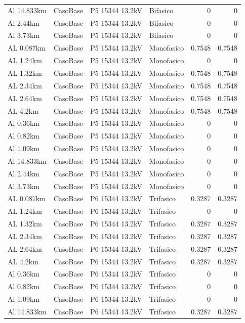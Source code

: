\documentclass[11pt,a4paper]{article}
\begin{document}
\begin{longtable}{llllrr}
Al 14.833km & CasoBase & P5 15344 13.2kV & Bifasico & 0 & 0 \\
Al 2.44km & CasoBase & P5 15344 13.2kV & Bifasico & 0 & 0 \\
Al 3.73km & CasoBase & P5 15344 13.2kV & Bifasico & 0 & 0 \\
AL 0.087km & CasoBase & P5 15344 13.2kV & Monofasico & 0.7548 & 0.7548 \\
AL 1.24km & CasoBase & P5 15344 13.2kV & Monofasico & 0 & 0 \\
AL 1.32km & CasoBase & P5 15344 13.2kV & Monofasico & 0.7548 & 0.7548 \\
AL 2.34km & CasoBase & P5 15344 13.2kV & Monofasico & 0.7548 & 0.7548 \\
AL 2.64km & CasoBase & P5 15344 13.2kV & Monofasico & 0.7548 & 0.7548 \\
AL 4.2km & CasoBase & P5 15344 13.2kV & Monofasico & 0.7548 & 0.7548 \\
Al 0.36km & CasoBase & P5 15344 13.2kV & Monofasico & 0 & 0 \\
Al 0.82km & CasoBase & P5 15344 13.2kV & Monofasico & 0 & 0 \\
Al 1.09km & CasoBase & P5 15344 13.2kV & Monofasico & 0 & 0 \\
Al 14.833km & CasoBase & P5 15344 13.2kV & Monofasico & 0 & 0 \\
Al 2.44km & CasoBase & P5 15344 13.2kV & Monofasico & 0 & 0 \\
Al 3.73km & CasoBase & P5 15344 13.2kV & Monofasico & 0 & 0 \\
AL 0.087km & CasoBase & P6 15344 13.2kV & Trifasico & 0.3287 & 0.3287 \\
AL 1.24km & CasoBase & P6 15344 13.2kV & Trifasico & 0 & 0 \\
AL 1.32km & CasoBase & P6 15344 13.2kV & Trifasico & 0.3287 & 0.3287 \\
AL 2.34km & CasoBase & P6 15344 13.2kV & Trifasico & 0.3287 & 0.3287 \\
AL 2.64km & CasoBase & P6 15344 13.2kV & Trifasico & 0.3287 & 0.3287 \\
AL 4.2km & CasoBase & P6 15344 13.2kV & Trifasico & 0.3287 & 0.3287 \\
Al 0.36km & CasoBase & P6 15344 13.2kV & Trifasico & 0 & 0 \\
Al 0.82km & CasoBase & P6 15344 13.2kV & Trifasico & 0 & 0 \\
Al 1.09km & CasoBase & P6 15344 13.2kV & Trifasico & 0 & 0 \\
Al 14.833km & CasoBase & P6 15344 13.2kV & Trifasico & 0.3287 & 0.3287 \\

\end{longtable}
\end{document}
